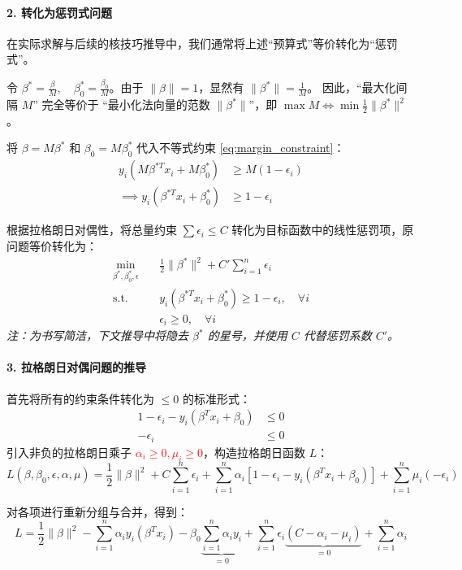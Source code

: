 \documentclass[UTF8]{ctexart}
\numberwithin{equation}{section}
\begin{document}
\paragraph{2. 转化为惩罚式问题}
在实际求解与后续的核技巧推导中，我们通常将上述“预算式”等价转化为“惩罚式”。

令 $\beta^* = \frac{\beta}{M}, \quad \beta_0^* = \frac{\beta_0}{M}$。由于 $\|\beta\| = 1$，显然有 $\|\beta^*\| = \frac{1}{M}$。
因此，“最大化间隔 $M$” 完全等价于 “最小化法向量的范数 $\|\beta^*\|$”，即 $\max M \iff \min \frac{1}{2}\|\beta^*\|^2$。

将 $\beta = M\beta^*$ 和 $\beta_0 = M\beta_0^*$ 代入不等式约束 \eqref{eq:margin_constraint}：
\begin{align*}
    y_i (M \beta^{*T} x_i + M \beta_0^*) &\ge M(1-\epsilon_i) \\
    \implies y_i (\beta^{*T} x_i + \beta_0^*) &\ge 1-\epsilon_i
\end{align*}

根据拉格朗日对偶性，将总量约束 $\sum \epsilon_i \le C$ 转化为目标函数中的线性惩罚项，原问题等价转化为：
\begin{align}
    \min_{\beta^*, \beta_0^*, \epsilon} \quad & \frac{1}{2}\|\beta^*\|^2 + C' \sum_{i=1}^n \epsilon_i \label{eq:penalty_form} \\
    \text{s.t.} \quad & y_i(\beta^{*T} x_i + \beta_0^*) \ge 1 - \epsilon_i, \quad \forall i \nonumber \\
    & \epsilon_i \ge 0, \quad \forall i \nonumber
\end{align}
\textit{注：为书写简洁，下文推导中将隐去 $\beta^*$ 的星号，并使用 $C$ 代替惩罚系数 $C'$。}

\paragraph{3. 拉格朗日对偶问题的推导}
首先将所有的约束条件转化为 $\le 0$ 的标准形式：
\begin{align*}
    1 - \epsilon_i - y_i(\beta^T x_i + \beta_0) &\le 0 \\
    - \epsilon_i &\le 0
\end{align*}
引入非负的拉格朗日乘子 \textcolor{red}{$\alpha_i \ge 0, \mu_i \ge 0$}，构造拉格朗日函数 $L$：
$$L(\beta, \beta_0, \epsilon, \alpha, \mu) = \frac{1}{2}\|\beta\|^2 + C \sum_{i=1}^n \epsilon_i + \sum_{i=1}^n \alpha_i [1 - \epsilon_i - y_i(\beta^T x_i + \beta_0)] + \sum_{i=1}^n \mu_i(-\epsilon_i)$$

对各项进行重新分组与合并，得到：
$$L = \frac{1}{2}\|\beta\|^2 - \sum_{i=1}^n \alpha_i y_i (\beta^T x_i) - \beta_0 \underbrace{\sum_{i=1}^n \alpha_i y_i}_{=0} + \sum_{i=1}^n \epsilon_i \underbrace{(C - \alpha_i - \mu_i)}_{=0} + \sum_{i=1}^n \alpha_i$$
\end{document}
